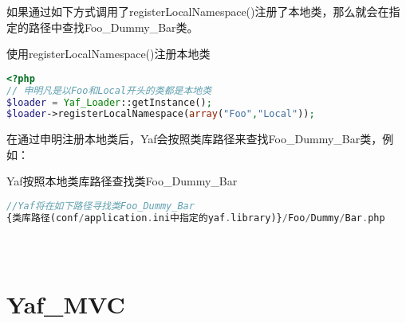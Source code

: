 如果通过如下方式调用了registerLocalNamespace()注册了本地类，那么就会在指定的路径中查找Foo\_Dummy\_Bar类。

\begin{example}
使用registerLocalNamespace()注册本地类
\begin{lstlisting}[language=PHP]
<?php
// 申明凡是以Foo和Local开头的类都是本地类
$loader = Yaf_Loader::getInstance();
$loader->registerLocalNamespace(array("Foo","Local"));
\end{lstlisting}
\end{example}

在通过申明注册本地类后，Yaf会按照类库路径来查找Foo\_Dummy\_Bar类，例如：

\begin{example}
Yaf按照本地类库路径查找类Foo\_Dummy\_Bar
\begin{lstlisting}[language=PHP]
//Yaf将在如下路径寻找类Foo_Dummy_Bar
{类库路径(conf/application.ini中指定的yaf.library)}/Foo/Dummy/Bar.php
\end{lstlisting}
\end{example}



\begin{example}

\begin{lstlisting}[language=PHP]

\end{lstlisting}
\end{example}



\begin{example}

\begin{lstlisting}[language=PHP]

\end{lstlisting}
\end{example}



\begin{example}

\begin{lstlisting}[language=PHP]

\end{lstlisting}
\end{example}




\chapter{Yaf\_MVC}

